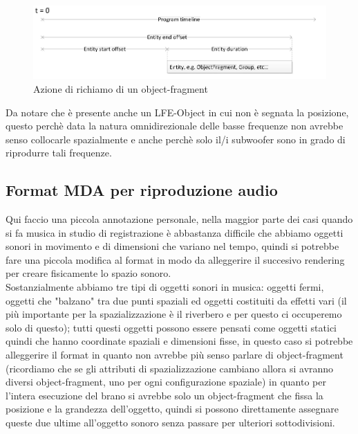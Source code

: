 \documentclass[12pt,a4paper]{report}
\begin{document}
\begin{figure}[htbp]
	\centering
	\includegraphics[scale=0.50]{figures/timeline2.png}
	
	\caption {Azione di richiamo di un object-fragment} 
	\label{fig:time}
	\end{figure}

Da notare che è presente anche un LFE-Object in cui non è segnata la posizione, questo perchè data la natura omnidirezionale delle basse frequenze non avrebbe senso collocarle spazialmente e anche perchè solo il/i subwoofer sono in grado di riprodurre tali frequenze.

\subsection{Format MDA per riproduzione audio}

Qui faccio una piccola annotazione personale, nella maggior parte dei casi quando si fa musica in studio di registrazione è abbastanza difficile che abbiamo oggetti sonori in movimento e di dimensioni che variano nel tempo, quindi si potrebbe fare una piccola modifica al format in modo da alleggerire il succesivo rendering per creare fisicamente lo spazio sonoro.\\

Sostanzialmente abbiamo tre tipi di oggetti sonori in musica: oggetti fermi, oggetti che "balzano" tra due punti spaziali ed oggetti costituiti da effetti vari (il più importante per la spazializzazione è il riverbero e per questo ci occuperemo solo di questo); tutti questi oggetti possono essere pensati come oggetti statici quindi che hanno coordinate spaziali e dimensioni fisse, in questo caso si potrebbe alleggerire il format in quanto non avrebbe più senso parlare di object-fragment (ricordiamo che se gli attributi di spazializzazione cambiano allora si avranno diversi object-fragment, uno per ogni configurazione spaziale) in quanto per l'intera esecuzione del brano si avrebbe solo un object-fragment che fissa la posizione e la grandezza dell'oggetto, quindi si possono direttamente assegnare queste due ultime all'oggetto sonoro senza passare per ulteriori sottodivisioni.\\
\end{document}
